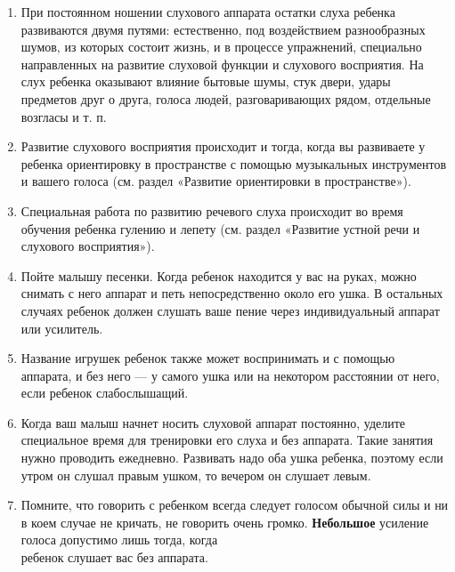 \documentclass{book}
\begin{document}
\begin{enumerate}
\def\labelenumi{\arabic{enumi}.}
\item
  
  При постоянном ношении слухового аппарата остатки слуха ребенка
  развиваются двумя путями: естественно, под воздействием разнообразных
  шумов, из которых состоит жизнь, и в процессе упражнений, специально
  направленных на развитие слуховой функции и слухового восприятия. На
  слух ребенка оказывают влияние бытовые шумы, стук двери, удары
  предметов друг о друга, голоса людей, разговаривающих рядом, отдельные
  возгласы и т. п.
  
\item
  
  Развитие слухового восприятия происходит и тогда, когда вы развиваете
  у ребенка ориентировку в пространстве с помощью музыкальных
  инструментов и вашего голоса (см. раздел «Развитие ориентировки в
  пространстве»).
  
\item
  
  Специальная работа по развитию речевого слуха происходит во время
  обучения ребенка гулению и лепету (см. раздел «Развитие устной речи и
  слухового восприятия»).
  
\item
  
  Пойте малышу песенки. Когда ребенок находится у вас на руках, можно
  снимать с него аппарат и петь непосредственно около его ушка. В
  остальных случаях ребенок должен слушать ваше пение через
  индивидуальный аппарат или усилитель.
  
\item
  
  Название игрушек ребенок также может воспринимать и с помощью
  аппарата, и без него --- у самого ушка или на некотором расстоянии от
  него, если ребенок слабослышащий.
  
\item
  
  Когда ваш малыш начнет носить слуховой аппарат постоянно, уделите
  специальное время для тренировки его слуха и без аппарата. Такие
  занятия нужно проводить ежедневно. Развивать надо оба ушка ребенка,
  поэтому если утром он слушал правым ушком, то вечером он слушает
  левым.
  
\item
  
  Помните, что говорить с ребенком всегда следует голосом обычной силы и
  ни в коем случае не кричать, не говорить очень громко.
  \textbf{Небольшое} усиление голоса допустимо лишь тогда, когда\\
  ребенок слушает вас без аппарата.
  
\end{enumerate}
\end{document}
